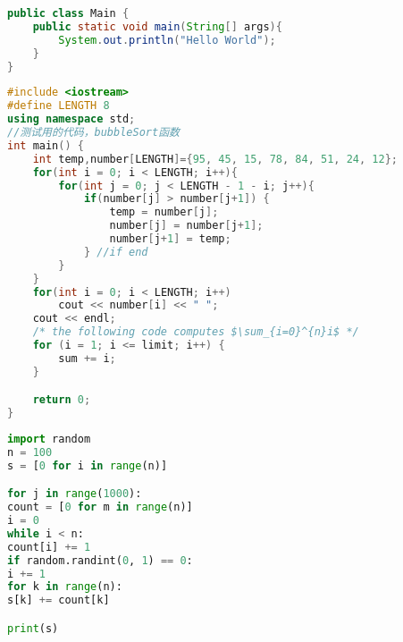 \documentclass[UTF8, onecolumn, a4paper]{article}
\begin{document}
	
\begin{lstlisting}[language={java}, title={helloWorld.java}]
public class Main {
	public static void main(String[] args){
		System.out.println("Hello World");
	}
}
\end{lstlisting}

\begin{lstlisting}[language={c++}, title={bubbleSort.c},mathescape] 
#include <iostream>  
#define LENGTH 8  
using namespace std;  
//测试用的代码，bubbleSort函数  
int main() {  
	int temp,number[LENGTH]={95, 45, 15, 78, 84, 51, 24, 12};  
	for(int i = 0; i < LENGTH; i++){  
		for(int j = 0; j < LENGTH - 1 - i; j++){  
			if(number[j] > number[j+1]) {  
				temp = number[j];  
				number[j] = number[j+1];  
				number[j+1] = temp;  
			} //if end  
		}
	}
	for(int i = 0; i < LENGTH; i++) 
		cout << number[i] << " ";  
	cout << endl;
	/* the following code computes $\sum_{i=0}^{n}i$ */
	for (i = 1; i <= limit; i++) {
		sum += i;
	}

	return 0;  
}
\end{lstlisting}

\begin{lstlisting}[language={python}, title={test.py}]
import random
n = 100
s = [0 for i in range(n)]

for j in range(1000):
count = [0 for m in range(n)]
i = 0
while i < n:
count[i] += 1
if random.randint(0, 1) == 0:
i += 1
for k in range(n):
s[k] += count[k]

print(s)
\end{lstlisting}
	
\end{document}
